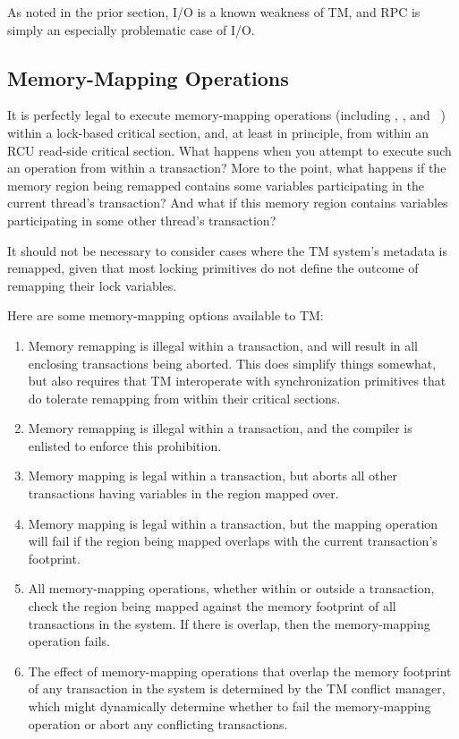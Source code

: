 As noted in the prior section, I/O is a known weakness of TM, and RPC
is simply an especially problematic case of I/O.

\subsection{Memory-Mapping Operations}
\label{sec:future:Memory-Mapping Operations}

It is perfectly legal to execute memory-mapping operations (including
, , and ~\cite{TheOpenGroup1997SUS})
within a lock-based critical section,
and, at least in principle, from within an RCU read-side critical section.
What happens when you attempt to execute such an operation from within
a transaction?
More to the point, what happens if the memory region being remapped
contains some variables participating in the current thread's transaction?
And what if this memory region contains variables participating in some
other thread's transaction?

It should not be necessary to consider cases where the TM system's
metadata is remapped, given that most locking primitives do not define
the outcome of remapping their lock variables.

Here are some memory-mapping options available to TM:

\begin{enumerate}
\item	Memory remapping is illegal within a transaction, and will result
	in all enclosing transactions being aborted.
	This does simplify things somewhat, but also requires that TM
	interoperate with synchronization primitives that do tolerate
	remapping from within their critical sections.
\item	Memory remapping is illegal within a transaction, and the
	compiler is enlisted to enforce this prohibition.
\item	Memory mapping is legal within a transaction, but aborts all
	other transactions having variables in the region mapped over.
\item	Memory mapping is legal within a transaction, but the mapping
	operation will fail if the region being mapped overlaps with
	the current transaction's footprint.
\item	All memory-mapping operations, whether within or outside a
	transaction, check the region being mapped against the memory
	footprint of all transactions in the system.
	If there is overlap, then the memory-mapping operation fails.
\item	The effect of memory-mapping operations that overlap the memory
	footprint of any transaction in the system is determined by the
	TM conflict manager, which might dynamically determine whether
	to fail the memory-mapping operation or abort any conflicting
	transactions.
\end{enumerate}

